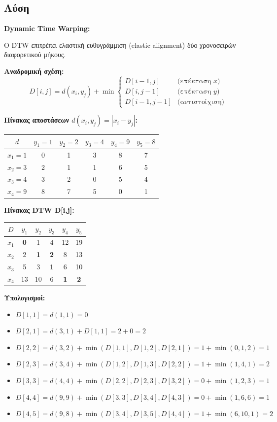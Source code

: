 \subsection*{Λύση}

\textbf{Dynamic Time Warping:}

Ο DTW επιτρέπει ελαστική ευθυγράμμιση (elastic alignment) δύο χρονοσειρών
διαφορετικού μήκους.

\textbf{Αναδρομική σχέση:}
$$D[i,j] = d(x_i, y_j) + \min \begin{cases}
D[i-1,j] & \text{(επέκταση } x\text{)} \\
D[i,j-1] & \text{(επέκταση } y\text{)} \\
D[i-1,j-1] & \text{(αντιστοίχιση)}
\end{cases}$$

\textbf{Πίνακας αποστάσεων $d(x_i, y_j) = |x_i - y_j|$:}

\begin{center}
\begin{tabular}{c|ccccc}
$d$ & $y_1=1$ & $y_2=2$ & $y_3=4$ & $y_4=9$ & $y_5=8$ \\
\hline
$x_1=1$ & 0 & 1 & 3 & 8 & 7 \\
$x_2=3$ & 2 & 1 & 1 & 6 & 5 \\
$x_3=4$ & 3 & 2 & 0 & 5 & 4 \\
$x_4=9$ & 8 & 7 & 5 & 0 & 1 \\
\end{tabular}
\end{center}

\textbf{Πίνακας DTW D[i,j]:}

\begin{center}
\begin{tabular}{c|ccccc}
$D$ & $y_1$ & $y_2$ & $y_3$ & $y_4$ & $y_5$ \\
\hline
$x_1$ & \textbf{0} & 1 & 4 & 12 & 19 \\
$x_2$ & 2 & \textbf{1} & \textbf{2} & 8 & 13 \\
$x_3$ & 5 & 3 & \textbf{1} & 6 & 10 \\
$x_4$ & 13 & 10 & 6 & \textbf{1} & \textbf{2} \\
\end{tabular}
\end{center}

\textbf{Υπολογισμοί:}
\begin{itemize}
    \item $D[1,1] = d(1,1) = 0$
    \item $D[2,1] = d(3,1) + D[1,1] = 2 + 0 = 2$
    \item $D[2,2] = d(3,2) + \min(D[1,1], D[1,2], D[2,1]) = 1 + \min(0, 1, 2) = 1$
    \item $D[2,3] = d(3,4) + \min(D[1,2], D[1,3], D[2,2]) = 1 + \min(1, 4, 1) = 2$
    \item $D[3,3] = d(4,4) + \min(D[2,2], D[2,3], D[3,2]) = 0 + \min(1, 2, 3) = 1$
    \item $D[4,4] = d(9,9) + \min(D[3,3], D[3,4], D[4,3]) = 0 + \min(1, 6, 6) = 1$
    \item $D[4,5] = d(9,8) + \min(D[3,4], D[3,5], D[4,4]) = 1 + \min(6, 10, 1) = 2$
\end{itemize}

